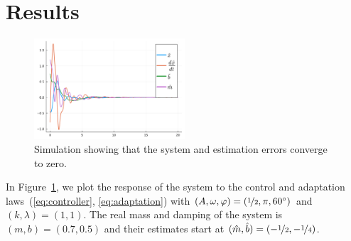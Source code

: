 \section{Results}
\label{sec:results}

\begin{figure}
  \centering
  \includegraphics[width=0.5\textwidth]{./figures/adaptationrule2.pdf}
  \caption{Simulation showing that the system and estimation errors converge to
  zero.}
  \label{fig:adaptation}
\end{figure}

In Figure~\ref{fig:adaptation}, we plot the response of the system to the
control and adaptation laws~(\ref{eq:controller}, \ref{eq:adaptation}) with
$(A, \omega, \varphi) = (\nicefrac{1}{2}, \pi, 60^\circ)$ and $(k, \lambda) =
(1, 1)$. The real mass and damping of the system is $(m, b) = (0.7, 0.5)$ and
their estimates start at $(\hat{m}, \hat{b}) = (-\nicefrac{1}{2},
-\nicefrac{1}{4})$.
